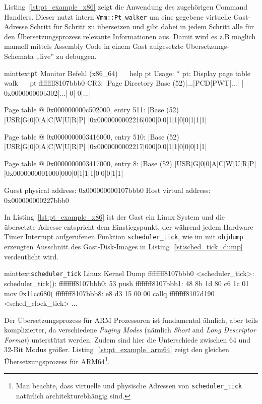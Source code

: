 Listing~\ref{lst:pt_example_x86} zeigt die Anwendung des zugehörigen Command
Handlers. Dieser nutzt intern \texttt{Vmm::Pt\_walker} um eine gegebene
virtuelle Gast-Adresse Schritt für Schritt zu übersetzen und gibt dabei in jedem
Schritt alle für den Übersetzungsprozess relevante Informationen aus. Damit wird
es z.B möglich manuell mittels Assembly Code in einem Gast aufgesetzte
Übersetzungs-Schemata ,,live'' zu debuggen.

\begin{mintlisting}[label=lst:pt_example_x86]{minttext}{\texttt{pt} Monitor Befehl (x86\_64)}
~\color{red}{monitor>}~ help pt
Usage:
* pt: Display page table walk
~\color{red}{monitor>}~ pt ffffffff8107bbb0
CR3:
|Page Directory Base (52)|...|PCD|PWT|...|
|         0x000000000b302|...|  0|  0|...|

Page table @ 0x000000000c502000, entry 511:
|Base (52)      |USR|G|0|0|A|C|W|U|R|P|
|0x0000000002216|000|0|0|1|1|0|0|1|1|1|

Page table @ 0x0000000003416000, entry 510:
|Base (52)      |USR|G|0|0|A|C|W|U|R|P|
|0x0000000002217|000|0|0|1|1|0|0|0|1|1|

Page table @ 0x0000000003417000, entry 8:
|Base (52)      |USR|G|0|0|A|C|W|U|R|P|
|0x0000000001000|000|0|1|1|1|0|0|0|1|1|

Guest physical address: 0x000000000107bbb0
Host virtual address: 0x000000000227bbb0
\end{mintlisting}

In Listing~\ref{lst:pt_example_x86} ist der Gast ein Linux System und die
übersetzte Adresse entspricht dem Einstiegspunkt, der während jedem Hardware
Timer Interrupt aufgerufenen Funktion \texttt{scheduler\_tick}, wie im mit
\texttt{objdump} erzeugten Ausschnitt des Gast-Disk-Images in
Listing~\ref{lst:sched_tick_dump} verdeutlicht wird.

\begin{mintlisting}[label=lst:sched_tick_dump]{minttext}{\texttt{scheduler\_tick} Linux Kernel Dump}
ffffffff8107bbb0 <scheduler_tick>:
scheduler_tick():
ffffffff8107bbb0:       53                      push   %
ffffffff8107bbb1:       48 8b 1d 80 c6 1c 01    mov    0x11cc680(%
ffffffff8107bbb8:       e8 d3 15 00 00          callq  ffffffff8107d190 <sched_clock_tick>
...
\end{mintlisting}

Der Übersetzungsprozess für ARM Prozessoren ist fundamental ähnlich, aber teils
komplizierter, da verschiedene \textit{Paging Modes} (nämlich \textit{Short}
and \textit{Long Descriptor Format}) unterstützt werden. Zudem sind hier die
Unterschiede zwischen 64 und 32-Bit Modus größer.
Listing~\ref{lst:pt_example_arm64} zeigt den gleichen Übersetzungsprozess für
ARM64\footnote{Man beachte, dass virtuelle und physische Adressen von
\texttt{scheduler\_tick} natürlich architekturebhängig sind.}.

